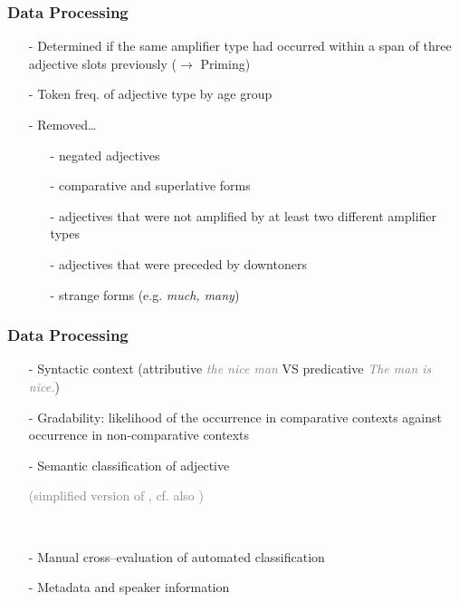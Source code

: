 \documentclass[12pt, table]{beamer}
\begin{document}
\begin{frame}
\frametitle{Data Processing}
\begin{itemize}
\item[-] Determined if the same amplifier type had occurred within a span of three adjective slots previously ($\rightarrow$ Priming)
\item[-] Token freq. of adjective type by age group \textcolor{gray}{\begin{scriptsize}\citep{tagliamonte2005weird}\end{scriptsize}} 
\item[-] Removed\dots
\begin{itemize}
\item[-] negated adjectives
\item[-] comparative and superlative forms
\item[-] adjectives that were not amplified by at least two different amplifier types
\item[-] adjectives that were preceded by downtoners
\item[-] strange forms (e.g. \textit{much, many})
\end{itemize}
\end{itemize} 
\end{frame}

\begin{frame}
\frametitle{Data Processing}
\begin{itemize}
\item[-] Syntactic context (attributive \textcolor{gray}{\textit{the nice man}} VS predicative \textcolor{gray}{\textit{The man is nice.}})
\item[-] Gradability: likelihood of the occurrence in comparative contexts against occurrence in non-comparative contexts
\item[-] Semantic classification of adjective \textcolor{gray}{\begin{scriptsize}(simplified version of \citet{dixon1977adjectives}, cf. also \citet{darcy2015stability, tagliamonte2005weird, tagliamonte2006so, tagliamonte2008intensifiers})\end{scriptsize}}\\[.15cm] 
\item[-] Manual cross--evaluation of automated classification\\[.15cm]
\item[-] Metadata and speaker information
\end{itemize} 
\end{frame}
\end{document}
